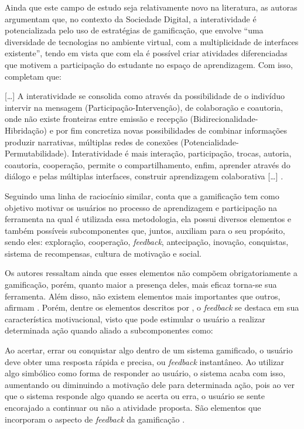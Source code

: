 Ainda que este campo de estudo seja relativamente novo na literatura, as autoras argumentam que, no contexto da Sociedade Digital, a interatividade é potencializada pelo uso de estratégias de gamificação, que envolve “uma diversidade de tecnologias no ambiente virtual, com a multiplicidade de interfaces existente”, tendo em vista que com ela é possível criar atividades diferenciadas que motivem a participação do estudante no espaço de aprendizagem. Com isso,  completam que:

\begin{citacao}

[…] A interatividade se consolida como através da possibilidade de o indivíduo intervir na mensagem (Participação-Intervenção), de colaboração e coautoria, onde não existe fronteiras entre emissão e recepção (Bidirecionalidade-Hibridação) e por fim concretiza novas possibilidades de combinar informações produzir narrativas, múltiplas redes de conexões (Potencialidade-Permutabilidade). Interatividade é mais interação, participação, trocas, autoria, coautoria, cooperação, permite o compartilhamento, enfim, aprender através do diálogo e pelas múltiplas interfaces, construir aprendizagem colaborativa […] \cite{valentim2016interatividade}.

\end{citacao}
Seguindo uma linha de raciocínio similar,  conta que a gamificação tem como objetivo motivar os usuários no processo de aprendizagem e participação na ferramenta na qual é utilizada essa metodologia, ela possui diversos elementos e também possíveis subcomponentes que, juntos, auxiliam para o seu propósito, sendo eles: exploração, cooperação, \textit{feedback}, antecipação, inovação, conquistas, sistema de recompensas, cultura de motivação e social. 

Os autores ressaltam ainda que esses elementos não compõem obrigatoriamente a gamificação, porém, quanto maior a presença deles, mais eficaz torna-se sua ferramenta. Além disso, não existem elementos mais importantes que outros, afirmam . Porém, dentre os elementos descritos por , o  \textit{feedback}  se destaca em sua característica motivacional, visto que pode estimular o usuário a realizar determinada ação quando aliado a subcomponentes como:

\begin{citacao}

Ao acertar, errar ou conquistar algo dentro de um sistema gamificado, o usuário deve obter uma resposta rápida e precisa, ou \textit{feedback} instantâneo. Ao utilizar algo simbólico como forma de responder ao usuário, o sistema acaba com isso, aumentando ou diminuindo a motivação dele para determinada ação, pois ao ver que o sistema responde algo quando se acerta ou erra, o usuário se sente encorajado a continuar ou não a atividade proposta. São elementos que incorporam o aspecto de \textit{feedback} da gamificação \cite{costa2018revisao}.

\end{citacao}

